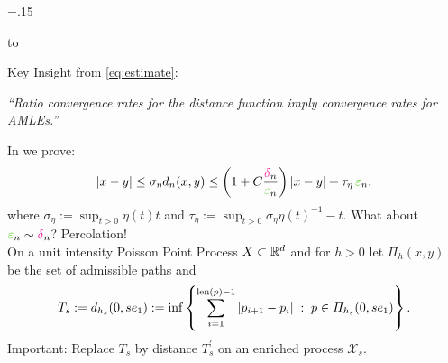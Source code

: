 \newdimen\bottomHeight%
\bottomHeight=.15\textheight%

\begin{minipage}[t][\seplineHeight][b]{\textwidth}%
\vbox to \seplineHeight{%
\vfill%
\begin{center}%
\textcolor{sky}{%
\rule{\textwidth}{.2mm}}%
\end{center}%
\vfill%
}%
\end{minipage}%
\noindent%

\begin{minipage}[b][\midHeight][t]{.34\textwidth}%
{\color{BaseDarkColor} Key Insight from \cref{eq:estimate}:}
%
\begin{block}{}
\centering%
\textit{%
\enquote{Ratio convergence rates for the distance function imply convergence rates for AMLEs.}}
\end{block}
%
In \cite{bungert2021uniform} we prove:
\abovedisplayskip=0pt%
\belowdisplayskip=0pt%
\begin{align*}
\abs{x-y} \leq 
\sigma_\eta d_n(x,y)
\leq 
\left(1 + C \frac{\gres_n}{\gscale_n}\right) 
\abs{x-y} + \tau_\eta \, \gscale_n,
\end{align*}
where
$\sigma_\eta := \sup_{t>0}\eta(t)t$ and $\tau_\eta := \sup_{t>0}\sigma_\eta\eta(t)^{-1}-t.$
%
%
\vspace{1em}
{\color{BaseDarkColor} \noindent What about $\gscale_n\sim\gres_n$? Percolation!}\\
\small
On a unit intensity Poisson Point Process $X\subset\mathbb{R}^d$ and for $h>0$ let $\Pi_h(x,y)$ be the set of admissible paths and
%
\begin{align*}
T_s := d_{h_s}(0,s e_1) := \inf 
\left\lbrace\sum_{i=1}^{\operatorname{len}(p)-1} \left|p_{i+1}-p_{i}\right| \;:\; 
p\in\Pi_{h_s}(0,s e_1)
\right\rbrace.
\end{align*}
%
\alert{Important}: Replace $T_s$ by distance $T_s^\prime$ on an \alert{enriched process} $\mathcal{X}_s$.
\end{minipage}%
